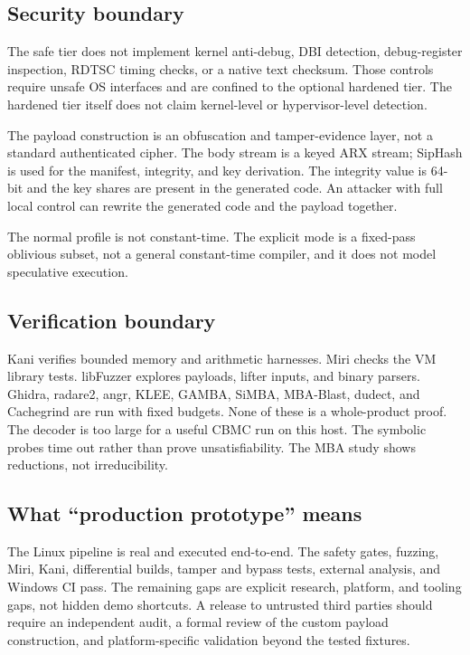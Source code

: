 \subsection{Security boundary}

The safe tier does not implement kernel anti-debug, DBI detection, debug-register
inspection, RDTSC timing checks, or a native text checksum. Those controls require
unsafe OS interfaces and are confined to the optional hardened tier. The
hardened tier itself does not claim kernel-level or hypervisor-level detection.

The payload construction is an obfuscation and tamper-evidence layer, not a
standard authenticated cipher. The body stream is a keyed ARX stream; SipHash is
used for the manifest, integrity, and key derivation. The integrity value is
64-bit and the key shares are present in the generated code. An attacker with
full local control can rewrite the generated code and the payload together.

The normal profile is not constant-time. The explicit mode is a fixed-pass
oblivious subset, not a general constant-time compiler, and it does not model
speculative execution.

\subsection{Verification boundary}

Kani verifies bounded memory and arithmetic harnesses. Miri checks the VM library
tests. libFuzzer explores payloads, lifter inputs, and binary parsers. Ghidra,
radare2, angr, KLEE, GAMBA, SiMBA, MBA-Blast, dudect, and Cachegrind are run with
fixed budgets. None of these is a whole-product proof. The decoder is too large
for a useful CBMC run on this host. The symbolic probes time out rather than
prove unsatisfiability. The MBA study shows reductions, not irreducibility.

\subsection{What ``production prototype'' means}

The Linux pipeline is real and executed end-to-end. The safety gates, fuzzing,
Miri, Kani, differential builds, tamper and bypass tests, external analysis, and
Windows CI pass. The remaining gaps are explicit research, platform, and tooling
gaps, not hidden demo shortcuts. A release to untrusted third parties should
require an independent audit, a formal review of the custom payload
construction, and platform-specific validation beyond the tested fixtures.
